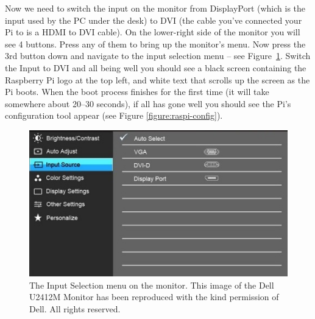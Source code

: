 Now we need to switch the input on the monitor from DisplayPort (which
is the input used by the PC under the desk) to DVI (the cable you've
connected your Pi to is a HDMI to DVI cable). On the lower-right side
of the monitor you will see 4 buttons. Press any of them to bring up
the monitor's menu. Now press the 3rd button down and navigate to the
input selection menu -- see Figure~\ref{figure:monitorswitch}. Switch
the Input to DVI and all being well you should see a black screen
containing the Raspberry Pi logo at the top left, and white text that
scrolls up the screen as the Pi boots. When the boot process finishes
for the first time (it will take somewhere about 20--30 seconds), if
all has gone well you should see the Pi's configuration tool appear
(see Figure \ref{figure:raspi-config}).

\begin{figure}
\centerline{\includegraphics[width=12cm]{images/DellInputMenu.jpg}}
\caption{The Input Selection menu on the monitor. This image  of the Dell U2412M Monitor has been reproduced with the kind permission of Dell. All rights reserved.}\label{figure:monitorswitch}
\end{figure}

